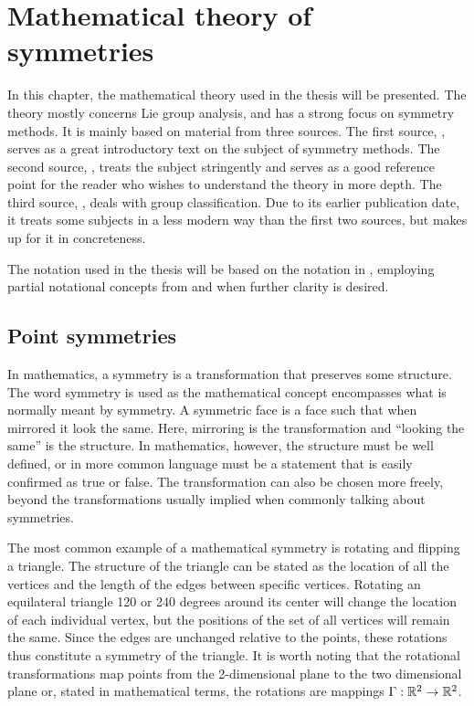 \chapter{Mathematical theory of symmetries}

In this chapter, the mathematical theory used in the thesis will be presented.
The theory mostly concerns Lie group analysis, and has a strong focus on symmetry methods. %
It is mainly based on material from three sources.
The first source, \cite{hydon2000symmetry}, serves as a great introductory text on the subject of symmetry methods.
The second source, \cite{olver1995equivalence}, treats the subject stringently and serves as a good reference point for the reader who wishes to understand the theory in more depth.
The third source, \cite{ovsiannikov1982group}, deals with group classification.
Due to its earlier publication date, it treats some subjects in a less modern way than the first two sources, but makes up for it in concreteness.

The notation used in the thesis will be based on the notation in \cite{hydon2000symmetry}, employing partial notational concepts from \cite{olver1995equivalence} and \cite{ovsiannikov1982group} when further clarity is desired.

\section{Point symmetries}

In mathematics, a symmetry is a transformation that preserves some structure.
The word symmetry is used as the mathematical concept encompasses what is normally meant by symmetry.
A symmetric face is a face such that when mirrored it look the same.
Here, mirroring is the transformation and \enquote{looking the same} is the structure.
In mathematics, however, the structure must be well defined, or in more common language must be a statement that is easily confirmed as true or false.
The transformation can also be chosen more freely, beyond the transformations usually implied when commonly talking about symmetries.

The most common example of a mathematical symmetry is rotating and flipping a triangle.
The structure of the triangle can be stated as the location of all the vertices and the length of the edges between specific vertices.
Rotating an equilateral triangle 120 or 240 degrees around its center will change the location of each individual vertex, but the positions of the set of all vertices will remain the same.
Since the edges are unchanged relative to the points, these rotations thus constitute a symmetry of the triangle.
It is worth noting that the rotational transformations map points from the 2-dimensional plane to the two dimensional plane or, stated in mathematical terms, the rotations are mappings \(\Gamma: \mathbb{R}^2 \to \mathbb{R}^2\).

